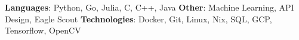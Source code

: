 \textbf{Languages}{: Python, Go, Julia, C, C++, Java}
\hfill
\textbf{Other}{: Machine Learning, API Design, Eagle Scout}
\vspace{3pt}
\textbf{Technologies}{: Docker, Git, Linux, Nix, SQL, GCP, Tensorflow, OpenCV}
